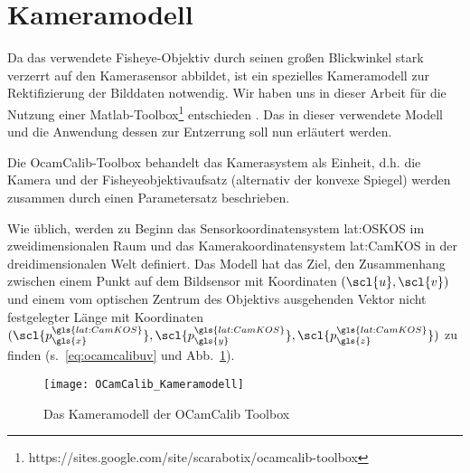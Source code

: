 \section{Kameramodell} \label{sec:kameramodell}
Da das verwendete Fisheye-Objektiv durch seinen großen Blickwinkel stark verzerrt auf den Kamerasensor abbildet, ist ein spezielles Kameramodell zur Rektifizierung der Bilddaten notwendig. Wir haben uns in dieser Arbeit für die Nutzung einer Matlab-Toolbox\footnote{https://sites.google.com/site/scarabotix/ocamcalib-toolbox} entschieden  \autocite{scaramuzzaFlexibleTechniqueAccurate2006, scaramuzzaToolboxEasilyCalibrating2006, scaramuzzaOmnidirectionalVisionCalibration2007, rufliAutomaticDetectionCheckerboards2008}. Das in dieser verwendete Modell und die Anwendung dessen zur Entzerrung soll nun erläutert werden. 

Die OcamCalib-Toolbox behandelt das Kamerasystem als Einheit, d.h. die Kamera und der Fisheyeobjektivaufsatz (alternativ der konvexe Spiegel) werden zusammen durch einen Parametersatz beschrieben.

Wie üblich, werden zu Beginn das Sensorkoordinatensystem \gls{lat:OSKOS} im zweidimensionalen Raum und das Kamerakoordinatensystem \gls{lat:CamKOS} in der dreidimensionalen Welt definiert. Das Modell hat das Ziel, den Zusammenhang zwischen einem Punkt auf dem Bildsensor  mit Koordinaten \((\scl{u}, \scl{v})\) und einem vom optischen Zentrum des Objektivs ausgehenden Vektor nicht festgelegter Länge  mit Koordinaten \((\scl{p^{\gls{lat:CamKOS}}_{\gls{x}}}, \scl{p^{\gls{lat:CamKOS}}_{\gls{y}}}, \scl{p^{\gls{lat:CamKOS}}_{\gls{z}}})\) zu finden (s.~\eqref{eq:ocamcalibuv} und Abb.~\ref{fig:kameramodell}).

\begin{figure}[H]
  \centering
  \texttt{[image: OCamCalib\_Kameramodell]}
  \caption{Das Kameramodell der OCamCalib Toolbox}
  \label{fig:kameramodell}
\end{figure}

